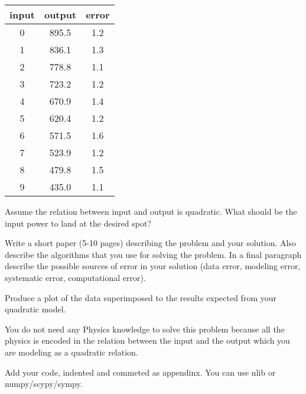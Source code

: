 \documentclass[12pt]{article}
\begin{document}
\begin{tabular}{ccc} \hline
input & output & error \\ \hline
0 & 895.5 & 1.2 \\
1 & 836.1 & 1.3 \\
2 & 778.8 & 1.1 \\
3 & 723.2 & 1.2 \\
4 & 670.9 & 1.4 \\
5 & 620.4 & 1.2 \\
6 & 571.5 & 1.6 \\
7 & 523.9 & 1.2 \\
8 & 479.8 & 1.5 \\
9 & 435.0 & 1.1 \\ \hline
\end{tabular}

Assume the relation between input and output is quadratic. What should be the input power to land at the desired spot?

Write a short paper (5-10 pages) describing the problem and your solution. Also describe the algorithms that you use for solving the problem. In a final paragraph describe the possible sources of error in your solution (data error, modeling error, systematic error, computational error).

Produce a plot of the data superimposed to the results expected from your quadratic model.

You do not need any Physics knowledge to solve this problem because all the physics is encoded in the relation between the input and the output which you are modeling as a quadratic relation.

Add your code, indented and commeted as appendinx. You can use nlib or numpy/scypy/sympy.
\end{document}
